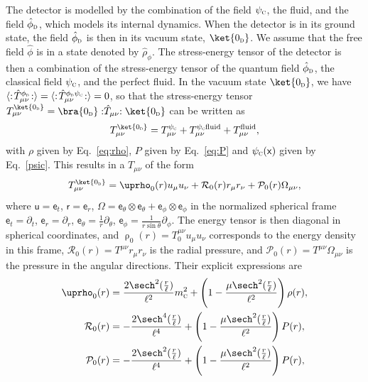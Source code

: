 \documentclass[letterpaper,12pt,titlepage,oneside,final]{book}
\newcommand{\normord}[1]{\vcentcolon\mathrel{#1}\vcentcolon}
\providecommand{\vcentcolon}{\mathrel{\mathop{:}}}
\newcommand{\mf}{\mathsf}%
\newcommand{\tc}[1]{\textsc{#1}}
\begin{document}
The detector is modelled by the combination of the field $\psi_\tc{c}$, the fluid, and the field $\hat{\phi}_\tc{d}$, which models its internal dynamics. When the detector is in its ground state, the field $\hat{\phi}_\tc{d}$ is then in its vacuum state,  $\ket{0_\tc{d}}$. We assume that the free field $\hat{\phi}$ is in a state denoted by $\hat{\rho}_\phi$. The stress-energy tensor of the detector is then a combination of the stress-energy tensor of the quantum field $\hat{\phi}_\tc{d}$, the classical field $\psi_\tc{c}$, and the perfect fluid. In the vacuum state $\ket{0_\tc{d}}$, we have $\langle: \!\hat{T}_{\mu\nu}^{\phi_\tc{d}}\!:\rangle = \langle:\!\hat{T}_{\mu\nu}^{\phi_\tc{d}\psi_\tc{c}}\!:\rangle = 0$, so that the stress-energy tensor $T_{\mu\nu}^{\ket{0_\tc{d}}} = \bra{0_\tc{d}} \normord{\hat{T}_{\mu\nu}}\ket{0_\tc{d}}$ can be written as
\begin{equation}
    T_{\mu\nu}^{\ket{0_\tc{d}}} = T_{\mu\nu}^{\psi_\tc{c}} + T_{\mu\nu}^{\psi_\tc{c}\text{fluid}} + T^\textrm{fluid}_{\mu\nu},
\end{equation}
with $\rho$ given by Eq.~\eqref{eq:rho}, $P$ given by Eq.~\eqref{eq:P} and $\psi_\tc{c}(\mf x)$ given by Eq.~\eqref{psic}. This results in a $T_{\mu\nu}$ of the form
\begin{equation}
    T_{\mu\nu}^{\ket{0_\tc{d}}} = \uprho_0(r)u_\mu u_\nu + \mathcal{R}_0(r)r_\mu r_\nu + \mathcal{P}_0(r) \Omega_{\mu\nu},\label{eq:Tmunu0}
\end{equation}
where $\mathsf{u} = \mathsf{e}_t$, $\mathsf{r} = \mathsf{e}_r$, $\Omega = \mathsf{e}_\theta\otimes \mathsf{e}_\theta + \mathsf{e}_\phi\otimes \mathsf{e}_\phi$ in the normalized spherical frame $\mf{e}_t = \partial_t$, $\mf{e}_r = \partial_r$, $\mf{e}_\theta = \frac{1}{r}\partial_\theta$, $\mf{e}_\phi = \frac{1}{r \sin\theta}\partial_\phi$. The energy tensor is then diagonal in spherical coordinates, and $\uprho_0(r) = T^{\mu\nu}_0u_\mu u_\nu$ corresponds to the energy density in this frame, $\mathcal{R}_0(r)  = T^{\mu\nu}r_\mu r_\nu$ is the radial pressure, and $\mathcal{P}_0(r) = T^{\mu\nu} \Omega_{\mu\nu}$ is the pressure in the angular directions. Their explicit expressions are
\begin{align}
    \uprho_0(r) &= \frac{2\sech^2(\tfrac{r}{\ell})}{\ell^2}m_\tc{c}^2  + \left(1 - \frac{\mu \sech^2(\tfrac{r}{\ell})}{\ell^2}\right)\rho(r),\\
    \mathcal{R}_0(r) &= - \frac{2\sech^4(\tfrac{r}{\ell})}{\ell^4}+ \left(1 - \frac{\mu \sech^2(\tfrac{r}{\ell})}{\ell^2}\right)P(r),\nonumber\\
    \mathcal{P}_0(r) & = -\frac{2\sech^2(\tfrac{r}{\ell})}{\ell^4} + \left(1 - \frac{\mu \sech^2(\tfrac{r}{\ell})}{\ell^2}\right)P(r) \nonumber,
\end{align}
\end{document}
